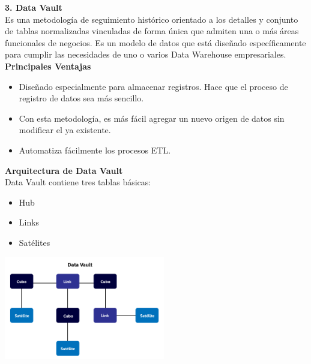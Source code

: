 \documentclass[twoside,twocolumn]{article}
\begin{document}
\noindent\textbf{\large 3. Data Vault}\\[0.1in]
Es una metodología de seguimiento histórico orientado a los detalles y conjunto de tablas normalizadas vinculadas de forma única que admiten una o más áreas funcionales de negocios. Es un modelo de datos que está diseñado específicamente para cumplir las necesidades de uno o varios Data Warehouse empresariales.\\[0.1in]
\textbf{Principales Ventajas}
\begin{itemize}
    \item Diseñado especialmente para almacenar registros. Hace que el proceso de registro de datos sea más sencillo.
    \item Con esta metodología, es más fácil agregar un nuevo origen de datos sin modificar el ya existente.
    \item Automatiza fácilmente los procesos ETL.
\end{itemize}
\textbf{Arquitectura de Data Vault}\\[0.1in]
Data Vault contiene tres tablas básicas:
\begin{itemize}
    \item Hub
    \item Links
    \item Satélites
\end{itemize}
\begin{center}
    \includegraphics[width=7cm]{./img/img6.png}
\end{center}

\end{document}
